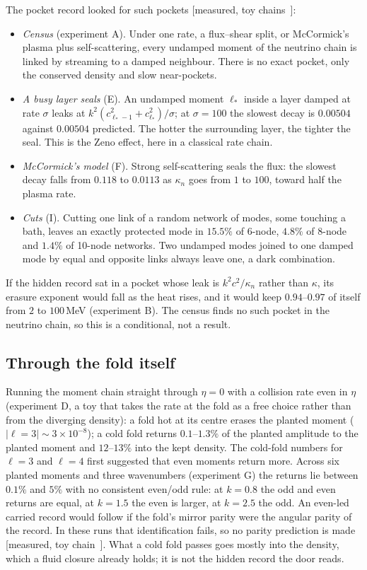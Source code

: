 \documentclass[11pt]{article}
\theoremstyle{definition}\newtheorem{hypothesis}{Hypothesis}\newtheorem{prediction}{Prediction}
\theoremstyle{remark}\newtheorem{remark}[theorem]{Remark}
\newcommand{\grade}[1]{\textsf{\small[#1]}}
\begin{document}
The pocket record looked for such pockets \grade{measured, toy chains~\cite{Pocket}}:
\begin{itemize}[nosep]
\item \emph{Census} (experiment A). Under one rate, a flux--shear split, or McCormick's plasma plus self-scattering, every undamped moment of the neutrino chain is linked by streaming to a damped neighbour. There is no exact pocket, only the conserved density and slow near-pockets.
\item \emph{A busy layer seals} (E). An undamped moment $\ell_*$ inside a layer damped at rate $\sigma$ leaks at $k^2(c_{\ell_*-1}^2+c_{\ell_*}^2)/\sigma$; at $\sigma=100$ the slowest decay is $0.00504$ against $0.00504$ predicted. The hotter the surrounding layer, the tighter the seal. This is the Zeno effect, here in a classical rate chain.
\item \emph{McCormick's model} (F). Strong self-scattering seals the flux: the slowest decay falls from $0.118$ to $0.0113$ as $\kappa_n$ goes from $1$ to $100$, toward half the plasma rate.
\item \emph{Cuts} (I). Cutting one link of a random network of modes, some touching a bath, leaves an exactly protected mode in $15.5\%$ of 6-node, $4.8\%$ of 8-node and $1.4\%$ of 10-node networks. Two undamped modes joined to one damped mode by equal and opposite links always leave one, a dark combination.
\end{itemize}
If the hidden record sat in a pocket whose leak is $k^2c^2/\kappa_n$ rather than $\kappa$, its erasure exponent would fall as the heat rises, and it would keep $0.94$--$0.97$ of itself from $2$ to $100$\,MeV (experiment B). The census finds no such pocket in the neutrino chain, so this is a conditional, not a result.

\subsection{Through the fold itself}
Running the moment chain straight through $\eta=0$ with a collision rate even in $\eta$ (experiment D, a toy that takes the rate at the fold as a free choice rather than from the diverging density): a fold hot at its centre erases the planted moment ($|\ell=3|\sim3\times10^{-8}$); a cold fold returns $0.1$--$1.3\%$ of the planted amplitude to the planted moment and $12$--$13\%$ into the kept density. The cold-fold numbers for $\ell=3$ and $\ell=4$ first suggested that even moments return more. Across six planted moments and three wavenumbers (experiment G) the returns lie between $0.1\%$ and $5\%$ with no consistent even/odd rule: at $k=0.8$ the odd and even returns are equal, at $k=1.5$ the even is larger, at $k=2.5$ the odd. An even-led carried record would follow if the fold's mirror parity were the angular parity of the record. In these runs that identification fails, so no parity prediction is made \grade{measured, toy chain~\cite{Pocket}}. What a cold fold passes goes mostly into the density, which a fluid closure already holds; it is not the hidden record the door reads.
\end{document}
